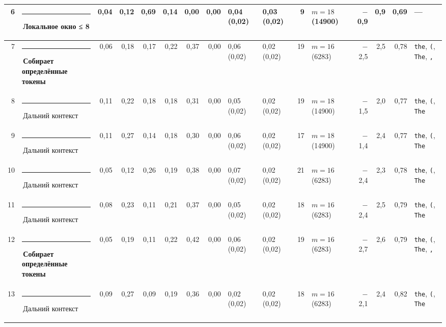 \documentclass[10pt]{article}
\begin{document}
\begin{minipage}{\linewidth}
\begin{center}
{\begin{tabular}{|r|l|r|r|r|r|r|r|l|l|r|l|r|r|r|l|}
6 & \textcolor[HTML]{1BAF7A}{\rule{0.62em}{0.62em}}\,\textbf{Локальное окно ≤ 8} & 0,04 & 0,12 & 0,69 & 0,14 & 0,00 & 0,00 & 0,04 (0,02) & 0,03 (0,02) & 9 & $m{=}18$ (14900) & $-$0,9 & 0,9 & 0,69 & — \\ \hline
7 & \textcolor[HTML]{6250D6}{\rule{0.62em}{0.62em}}\,\textbf{Собирает определённые токены} & 0,06 & 0,18 & 0,17 & 0,22 & 0,37 & 0,00 & 0,06 (0,02) & 0,02 (0,02) & 19 & $m{=}16$ (6283) & $-$2,5 & 2,5 & 0,78 & \texttt{\textvisiblespace{}the}, \texttt{\textvisiblespace{}(}, \texttt{\textvisiblespace{}The}, \texttt{\textvisiblespace{},} \\ \hline
8 & \textcolor[HTML]{C3C2B7}{\rule{0.62em}{0.62em}}\,Дальний контекст & 0,11 & 0,22 & 0,18 & 0,18 & 0,31 & 0,00 & 0,05 (0,02) & 0,02 (0,02) & 19 & $m{=}18$ (14900) & $-$1,5 & 2,0 & 0,77 & \texttt{\textvisiblespace{}the}, \texttt{\textvisiblespace{}(}, \texttt{\textvisiblespace{}The} \\ \hline
9 & \textcolor[HTML]{C3C2B7}{\rule{0.62em}{0.62em}}\,Дальний контекст & 0,11 & 0,27 & 0,14 & 0,18 & 0,30 & 0,00 & 0,06 (0,02) & 0,02 (0,02) & 17 & $m{=}18$ (14900) & $-$1,4 & 2,4 & 0,77 & \texttt{\textvisiblespace{}the}, \texttt{\textvisiblespace{}(}, \texttt{\textvisiblespace{}The} \\ \hline
10 & \textcolor[HTML]{C3C2B7}{\rule{0.62em}{0.62em}}\,Дальний контекст & 0,05 & 0,12 & 0,26 & 0,19 & 0,38 & 0,00 & 0,07 (0,02) & 0,02 (0,02) & 21 & $m{=}16$ (6283) & $-$2,4 & 2,3 & 0,78 & \texttt{\textvisiblespace{}the}, \texttt{\textvisiblespace{}(}, \texttt{\textvisiblespace{}The} \\ \hline
11 & \textcolor[HTML]{C3C2B7}{\rule{0.62em}{0.62em}}\,Дальний контекст & 0,08 & 0,23 & 0,11 & 0,21 & 0,37 & 0,00 & 0,05 (0,02) & 0,02 (0,02) & 18 & $m{=}16$ (6283) & $-$2,4 & 2,5 & 0,79 & \texttt{\textvisiblespace{}the}, \texttt{\textvisiblespace{}(}, \texttt{\textvisiblespace{}The} \\ \hline
12 & \textcolor[HTML]{6250D6}{\rule{0.62em}{0.62em}}\,\textbf{Собирает определённые токены} & 0,05 & 0,19 & 0,11 & 0,22 & 0,42 & 0,00 & 0,06 (0,02) & 0,02 (0,02) & 19 & $m{=}16$ (6283) & $-$2,7 & 2,6 & 0,79 & \texttt{\textvisiblespace{}the}, \texttt{\textvisiblespace{}(}, \texttt{\textvisiblespace{}The}, \texttt{\textvisiblespace{},} \\ \hline
13 & \textcolor[HTML]{C3C2B7}{\rule{0.62em}{0.62em}}\,Дальний контекст & 0,09 & 0,27 & 0,09 & 0,19 & 0,36 & 0,00 & 0,02 (0,02) & 0,02 (0,02) & 18 & $m{=}16$ (6283) & $-$2,1 & 2,4 & 0,82 & \texttt{\textvisiblespace{}the}, \texttt{\textvisiblespace{}(}, \texttt{\textvisiblespace{}The} \\ \hline
\hline\end{tabular}}\end{center}
\end{minipage}
\end{document}
